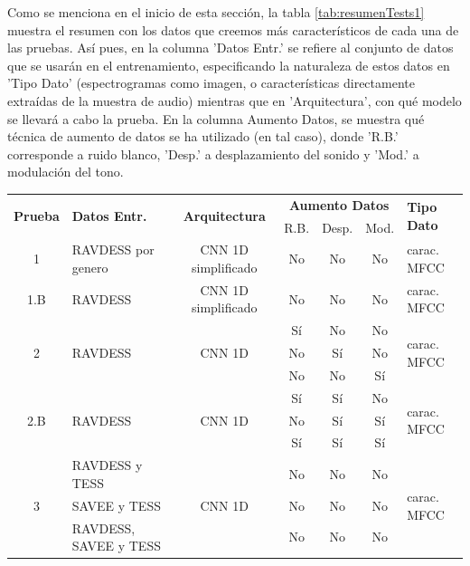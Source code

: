 \documentclass[11pt,a4paper,spanish]{book}
\begin{document}

	Como se menciona en el inicio de esta sección, la tabla \ref{tab:resumenTests1} muestra el resumen con los datos que creemos más característicos de cada una de las pruebas. Así pues, en la columna 'Datos Entr.' se refiere al conjunto de datos que se usarán en el entrenamiento, especificando la naturaleza de estos datos en 'Tipo Dato' (espectrogramas como imagen, o características directamente extraídas de la muestra de audio) mientras que en 'Arquitectura', con qué modelo se llevará a cabo la prueba. En la columna Aumento Datos, se muestra qué técnica de aumento de datos se ha utilizado (en tal caso), donde 'R.B.' corresponde a ruido blanco, 'Desp.' a desplazamiento del sonido y 'Mod.' a modulación del tono.

	\begin{table}[H]
	\centering
	\begin{center}
		\begin{tabular}{| c | p{3.5cm} | c | c c c | p{3.5cm} |}
			\hline
			\multirow{2}{*}{\textbf{Prueba}} &\multirow{2}{*}{\textbf{Datos Entr.}}& \multirow{2}{*}{\textbf{Arquitectura}} & 
			\multicolumn{3}{|c|}{\textbf{Aumento Datos}} & 
			\multirow{2}{*}{\textbf{Tipo Dato}} \\ \cline{4-6}
			& & & R.B. & Desp. & Mod. & \\ 
			\hline \hline
			
			1 & RAVDESS por genero & CNN 1D simplificado & No &No &No & carac. MFCC	\\ \hline
			1.B & RAVDESS & CNN 1D simplificado &No &No &No & carac. MFCC\\ \hline
			\multirow{3}{*}{2} & \multirow{3}{*}{RAVDESS} & \multirow{3}{*}{CNN 1D} &Sí &No &No  & \multirow{3}{*}{carac. MFCC}\\
			& & & No &Sí &No & 	\\
			& & & No &No &Sí  & 	\\ \hline
			
			\multirow{3}{*}{2.B} & \multirow{3}{*}{RAVDESS} & \multirow{3}{*}{CNN 1D } & Sí &Sí &No & \multirow{3}{*}{carac. MFCC}\\
			
			& &  & No &Sí &Sí & \\
			& &  & Sí &Sí &Sí& \\ \hline
			
			\multirow{3}{*}{3} & RAVDESS y TESS & \multirow{3}{*}{CNN 1D} &  No &No &No & \multirow{3}{*}{carac. MFCC}	\\ 
			\cline{2-2}
			& SAVEE y TESS &  &  No &No &No & 	\\
			\cline{2-2}
			& RAVDESS, SAVEE y TESS &  &  No &No &No & 	\\ \hline
			

\end{tabular}
\end{center}
\end{table}
\end{document}
